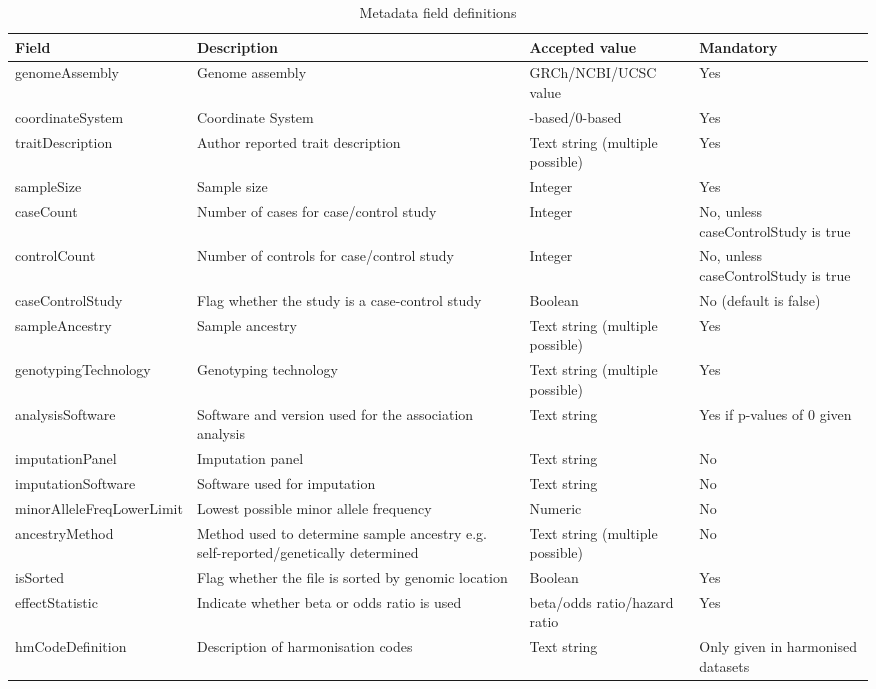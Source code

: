 \documentclass[11pt]{article}
\begin{document}
\begin{table}[h]
 \caption{Metadata field definitions}
 \centering
 \begin{tabularx}{\textwidth} { 
   | >{\hsize=1.4\hsize\centering\arraybackslash}X 
   | >{\hsize=1\hsize\centering\arraybackslash}X 
   | >{\hsize=1\hsize\centering\arraybackslash}X 
   | >{\hsize=0.6\hsize\centering\arraybackslash}X | } 
  \hline
  Field & Description & Accepted value & Mandatory \\
  \hline
  genomeAssembly & Genome assembly & GRCh/NCBI/UCSC value & Yes\\
  coordinateSystem & Coordinate System & 1-based/0-based & Yes\\
  traitDescription & Author reported trait description & Text string (multiple possible) & Yes\\
  sampleSize & Sample size & Integer & Yes\\
  caseCount & Number of cases for case/control study & Integer & No, unless caseControlStudy is true\\
  controlCount & Number of controls for case/control study & Integer & No, unless caseControlStudy is true\\
  caseControlStudy & Flag whether the study is a case-control study & Boolean & No (default is false)\\
  sampleAncestry & Sample ancestry & Text string (multiple possible) & Yes\\
  genotypingTechnology & Genotyping technology & Text string (multiple possible) & Yes\\
  analysisSoftware & Software and version used for the association analysis & Text string & Yes if p-values of 0 given\\
  imputationPanel & Imputation panel & Text string & No\\
  imputationSoftware & Software used for imputation & Text string & No\\
  minorAlleleFreqLowerLimit & Lowest possible minor allele frequency & Numeric & No\\
  ancestryMethod & Method used to determine sample ancestry e.g. self-reported/genetically determined  & Text string (multiple possible) & No\\
  isSorted & Flag whether the file is sorted by genomic location & Boolean & Yes\\
  effectStatistic & Indicate whether beta or odds ratio is used & beta/odds ratio/hazard ratio & Yes\\
  hmCodeDefinition & Description of harmonisation codes & Text string & Only given in harmonised datasets\\

\end{tabularx}
\end{table}
\end{document}
